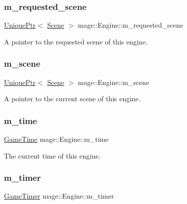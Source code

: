 \subsubsection{\texorpdfstring{m\+\_\+requested\+\_\+scene}{m\_requested\_scene}}
{\footnotesize\ttfamily \mbox{\hyperlink{namespacemage_a3316d7143a973e37adf1110f2e80ca31}{Unique\+Ptr}}$<$ \mbox{\hyperlink{classmage_1_1_scene}{Scene}} $>$ mage\+::\+Engine\+::m\+\_\+requested\+\_\+scene\hspace{0.3cm}{\ttfamily [private]}}

A pointer to the requested scene of this engine. \mbox{\label{classmage_1_1_engine_a2d4037208a0529838c81ccea08c9de11}} 
\subsubsection{\texorpdfstring{m\+\_\+scene}{m\_scene}}
{\footnotesize\ttfamily \mbox{\hyperlink{namespacemage_a3316d7143a973e37adf1110f2e80ca31}{Unique\+Ptr}}$<$ \mbox{\hyperlink{classmage_1_1_scene}{Scene}} $>$ mage\+::\+Engine\+::m\+\_\+scene\hspace{0.3cm}{\ttfamily [private]}}

A pointer to the current scene of this engine. \mbox{\label{classmage_1_1_engine_ab5f56d65109d276dd49ba43c504bbd26}} 
\subsubsection{\texorpdfstring{m\+\_\+time}{m\_time}}
{\footnotesize\ttfamily \mbox{\hyperlink{classmage_1_1_game_time}{Game\+Time}} mage\+::\+Engine\+::m\+\_\+time\hspace{0.3cm}{\ttfamily [private]}}

The current time of this engine. \mbox{\label{classmage_1_1_engine_a360589e71a3d081c6a748aa283d1526d}} 
\subsubsection{\texorpdfstring{m\+\_\+timer}{m\_timer}}
{\footnotesize\ttfamily \mbox{\hyperlink{classmage_1_1_game_timer}{Game\+Timer}} mage\+::\+Engine\+::m\+\_\+timer\hspace{0.3cm}{\ttfamily [private]}}

